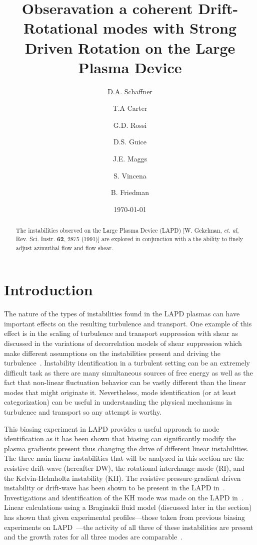 \documentclass[aip,pop,amsmath,amssymb,reprint,superscriptaddress]{revtex4-1} %
\begin{document}
\title{Obseravation a coherent Drift-Rotational modes with Strong Driven Rotation on the Large Plasma Device}
\author{D.A. Schaffner}
\author{T.A Carter}
\author{G.D. Rossi}
\author{D.S. Guice}
\author{J.E. Maggs}
\author{S. Vincena}
\author{B. Friedman}
\date{\today}
\begin{abstract}
The instabilities observed on the Large Plasma Device (LAPD) [W. Gekelman, \textit{et. al}, Rev. Sci. Instr. \textbf{62}, 2875 (1991)] are explored in conjunction with a the ability to finely adjust azimuthal flow and flow shear.

\end{abstract}
\maketitle

\section{Introduction}

The nature of the types of instabilities found in the LAPD plasmas can have important effects on the resulting turbulence and transport. One example of this effect is in the scaling of turbulence and transport suppression with shear as discussed in the variations of decorrelation models of shear suppression which make different assumptions on the instabilities present and driving the turbulence~\cite{schaffner13}. Instability identification in a turbulent setting can be an extremely difficult task as there are many simultaneous sources of free energy as well as the fact that non-linear fluctuation behavior can be vastly different than the linear modes that might originate it. Nevertheless, mode identification (or at least categorization) can be useful in understanding the physical mechanisms in turbulence and transport so any attempt is worthy.

This biasing experiment in LAPD provides a useful approach to mode identification as it has been shown that biasing can significantly modify the plasma gradients present thus changing the drive of different linear instabilities. The three main linear instabilities that will be analyzed in this section are the resistive drift-wave (hereafter DW), the rotational interchange mode (RI), and the Kelvin-Helmholtz instability (KH). The resistive pressure-gradient driven instability or drift-wave has been shown to be present in the LAPD in~\cite{penano00}. Investigations and identification of the KH mode was made on the LAPD in~\cite{horton04,perez06}. Linear calculations using a Braginskii fluid model (discussed later in the section) has shown that given experimental profiles---those taken from previous biasing experiments on LAPD~\cite{maggs07,carter09}---the activity of all three of these instabilities are present and the growth rates for all three modes are comparable~\cite{popovich10}. 
\end{document}
